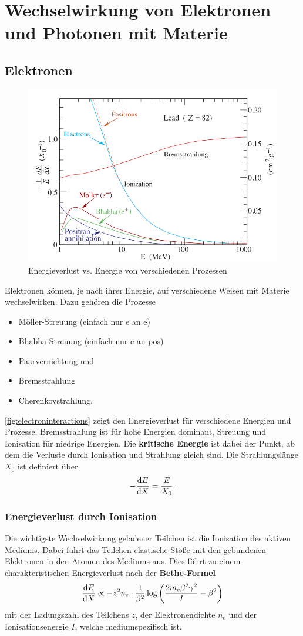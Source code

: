 \chapter{Wechselwirkung von Elektronen und Photonen mit Materie}
\section{Elektronen}
\begin{figure}
	\centering
	\includegraphics[width=.7\textwidth]{./img/electroninteractions.jpg}
	\caption{Energieverlust vs. Energie von verschiedenen Prozessen}
	\label{fig:electroninteractions}
\end{figure}
Elektronen können, je nach ihrer Energie, auf verschiedene Weisen mit Materie wechselwirken.
Dazu gehören die Prozesse
\begin{itemize}
	\item Möller-Streuung (einfach nur e an e)
	\item Bhabha-Streuung (einfach nur e an pos)
	\item Paarvernichtung und
	\item Bremsstrahlung
	\item Cherenkovstrahlung.
\end{itemize}
\autoref{fig:electroninteractions} zeigt den Energieverlust für verschiedene Energien und Prozesse.
Bremsstrahlung ist für hohe Energien dominant, Streuung und Ionisation für niedrige Energien.
Die \textbf{kritische Energie} ist dabei der Punkt, ab dem die Verluste durch Ionisation und Strahlung gleich sind.
Die Strahlungslänge $X_0$ ist definiert über
\begin{equation*}
	-\diff[E]{X} = \frac{E}{X_0}.
\end{equation*}

\subsection{Energieverlust durch Ionisation}
Die wichtigste Wechselwirkung geladener Teilchen ist die Ionisation des aktiven Mediums.
Dabei führt das Teilchen elastische Stöße mit den gebundenen Elektronen in den Atomen des Mediums aus.
Dies führt zu einem charakteristischen Energieverlust nach der \textbf{Bethe-Formel}
\begin{equation*}
	\diff[E]{X}\propto -z^2n_e\cdot\frac{1}{\beta^2}\log\left(\frac{2m_e\beta^2\gamma^2}{I} - \beta^2\right)
\end{equation*}
mit der Ladungszahl des Teilchens $z$, der Elektronendichte $n_e$ und der Ionisationsenergie $I$, welche mediumspezifisch ist.

